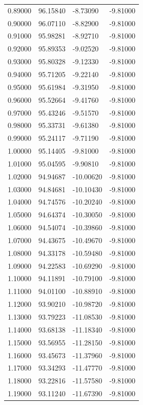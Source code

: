 \begin{table}
\begin{tabular}{llll}
0.89000 & 96.15840 & -8.73090 & -9.81000 \\
0.90000 & 96.07110 & -8.82900 & -9.81000 \\
0.91000 & 95.98281 & -8.92710 & -9.81000 \\
0.92000 & 95.89353 & -9.02520 & -9.81000 \\
0.93000 & 95.80328 & -9.12330 & -9.81000 \\
0.94000 & 95.71205 & -9.22140 & -9.81000 \\
0.95000 & 95.61984 & -9.31950 & -9.81000 \\
0.96000 & 95.52664 & -9.41760 & -9.81000 \\
0.97000 & 95.43246 & -9.51570 & -9.81000 \\
0.98000 & 95.33731 & -9.61380 & -9.81000 \\
0.99000 & 95.24117 & -9.71190 & -9.81000 \\
1.00000 & 95.14405 & -9.81000 & -9.81000 \\
1.01000 & 95.04595 & -9.90810 & -9.81000 \\
1.02000 & 94.94687 & -10.00620 & -9.81000 \\
1.03000 & 94.84681 & -10.10430 & -9.81000 \\
1.04000 & 94.74576 & -10.20240 & -9.81000 \\
1.05000 & 94.64374 & -10.30050 & -9.81000 \\
1.06000 & 94.54074 & -10.39860 & -9.81000 \\
1.07000 & 94.43675 & -10.49670 & -9.81000 \\
1.08000 & 94.33178 & -10.59480 & -9.81000 \\
1.09000 & 94.22583 & -10.69290 & -9.81000 \\
1.10000 & 94.11891 & -10.79100 & -9.81000 \\
1.11000 & 94.01100 & -10.88910 & -9.81000 \\
1.12000 & 93.90210 & -10.98720 & -9.81000 \\
1.13000 & 93.79223 & -11.08530 & -9.81000 \\
1.14000 & 93.68138 & -11.18340 & -9.81000 \\
1.15000 & 93.56955 & -11.28150 & -9.81000 \\
1.16000 & 93.45673 & -11.37960 & -9.81000 \\
1.17000 & 93.34293 & -11.47770 & -9.81000 \\
1.18000 & 93.22816 & -11.57580 & -9.81000 \\
1.19000 & 93.11240 & -11.67390 & -9.81000 \\

\end{tabular}
\end{table}
